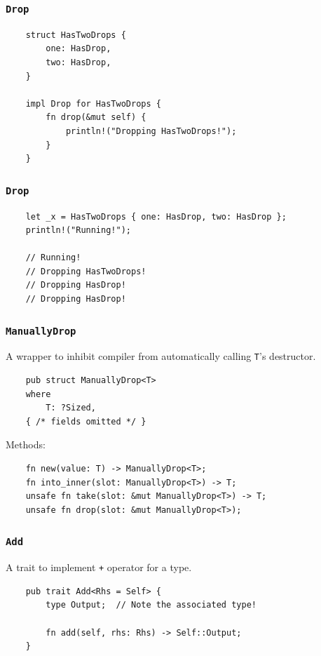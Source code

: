 \documentclass[aspectratio=1610,t]{beamer}
\begin{document}

\begin{frame}[fragile]
\frametitle{\texttt{Drop}}
\begin{verbatim}
    struct HasTwoDrops {
        one: HasDrop,
        two: HasDrop,
    }

    impl Drop for HasTwoDrops {
        fn drop(&mut self) {
            println!("Dropping HasTwoDrops!");
        }
    }
\end{verbatim}
\end{frame}


\begin{frame}[fragile]
\frametitle{\texttt{Drop}}
\begin{verbatim}
    let _x = HasTwoDrops { one: HasDrop, two: HasDrop };
    println!("Running!");

    // Running!
    // Dropping HasTwoDrops!
    // Dropping HasDrop!
    // Dropping HasDrop!
\end{verbatim}
\end{frame}


\begin{frame}[fragile]
\frametitle{\texttt{ManuallyDrop}}
A wrapper to inhibit compiler from automatically calling \texttt{T}’s destructor.

\begin{verbatim}
    pub struct ManuallyDrop<T> 
    where
        T: ?Sized, 
    { /* fields omitted */ }
\end{verbatim}

Methods:
\begin{verbatim}
    fn new(value: T) -> ManuallyDrop<T>;
    fn into_inner(slot: ManuallyDrop<T>) -> T;
    unsafe fn take(slot: &mut ManuallyDrop<T>) -> T;
    unsafe fn drop(slot: &mut ManuallyDrop<T>);
\end{verbatim}
\end{frame}


\begin{frame}[fragile]
\frametitle{\texttt{Add}}
A trait to implement \texttt{+} operator for a type.

\begin{verbatim}
    pub trait Add<Rhs = Self> {
        type Output;  // Note the associated type!

        fn add(self, rhs: Rhs) -> Self::Output;
    }
\end{verbatim}
\end{frame}
\end{document}
